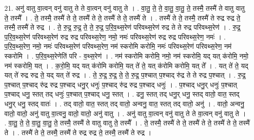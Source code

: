 \documentclass[17pt]{extarticle}
\begin{document}
21. अनु॑ वातु वा॒त्वन् वनु॑ वातु ते ते वा॒त्वन् वनु॑ वातु ते । . वा॒तु॒ ते॒ ते॒ वा॒तु॒ वा॒तु॒ ते॒ तस्मै॒ तस्मै॑ ते वातु वातु ते॒ तस्मै᳚ । . ते॒ तस्मै॒ तस्मै॑ ते ते॒ तस्मै॑ ते ते॒ तस्मै॑ ते ते॒ तस्मै॑ ते । . तस्मै॑ ते ते॒ तस्मै॒ तस्मै॑ ते रुद्र रुद्र ते॒ तस्मै॒ तस्मै॑ ते रुद्र । . ते॒ रु॒द्र॒ रु॒द्र॒ ते॒ ते॒ रु॒द्र॒ प॒रि॒व॒थ्स॒रेण॑ परिवथ्स॒रेण॑ रुद्र ते ते रुद्र परिवथ्स॒रेण॑ । . रु॒द्र॒ प॒रि॒व॒थ्स॒रेण॑ परिवथ्स॒रेण॑ रुद्र रुद्र परिवथ्स॒रेण॒ नमो॒ नमः॑ परिवथ्स॒रेण॑ रुद्र रुद्र परिवथ्स॒रेण॒ नमः॑ । . प॒रि॒व॒थ्स॒रेण॒ नमो॒ नमः॑ परिवथ्स॒रेण॑ परिवथ्स॒रेण॒ नम॑ स्करोमि करोमि॒ नमः॑ परिवथ्स॒रेण॑ परिवथ्स॒रेण॒ नम॑ स्करोमि । . प॒रि॒व॒थ्स॒रेणेति॑ परि - व॒थ्स॒रेण॑ । . नम॑ स्करोमि करोमि॒ नमो॒ नम॑ स्करोमि॒ यद् यत् क॑रोमि॒ नमो॒ नम॑ स्करोमि॒ यत् । . क॒रो॒मि॒ यद् यत् क॑रोमि करोमि॒ यत् ते॑ ते॒ यत् क॑रोमि करोमि॒ यत् ते᳚ । . यत् ते॑ ते॒ यद् यत् ते॑ रुद्र रुद्र ते॒ यद् यत् ते॑ रुद्र । . ते॒ रु॒द्र॒ रु॒द्र॒ ते॒ ते॒ रु॒द्र॒ प॒श्चात् प॒श्चाद् रु॑द्र ते ते रुद्र प॒श्चात् । . रु॒द्र॒ प॒श्चात् प॒श्चाद् रु॑द्र रुद्र प॒श्चाद् धनु॒र् धनुः॑ प॒श्चाद् रु॑द्र रुद्र प॒श्चाद् धनुः॑ । . प॒श्चाद् धनु॒र् धनुः॑ प॒श्चात् प॒श्चाद् धनु॒ स्तत् तद् धनुः॑ प॒श्चात् प॒श्चाद् धनु॒ स्तत् । . ढनु॒ स्तत् तद् धनु॒र् धनु॒ स्तद् वातो॒ वात॒ स्तद् धनु॒र् धनु॒ स्तद् वातः॑ । . तद् वातो॒ वात॒ स्तत् तद् वातो॒ अन्वनु॒ वात॒ स्तत् तद् वातो॒ अनु॑ । . वातो॒ अन्वनु॒ वातो॒ वातो॒ अनु॑ वातु वा॒त्वनु॒ वातो॒ वातो॒ अनु॑ वातु । . अनु॑ वातु वा॒त्वन् वनु॑ वातु ते ते वा॒त्वन् वनु॑ वातु ते । . वा॒तु॒ ते॒ ते॒ वा॒तु॒ वा॒तु॒ ते॒ तस्मै॒ तस्मै॑ ते वातु वातु ते॒ तस्मै᳚ । . ते॒ तस्मै॒ तस्मै॑ ते ते॒ तस्मै॑ ते ते॒ तस्मै॑ ते ते॒ तस्मै॑ ते । . तस्मै॑ ते ते॒ तस्मै॒ तस्मै॑ ते रुद्र रुद्र ते॒ तस्मै॒ तस्मै॑ ते रुद्र । \newline
\end{document}
